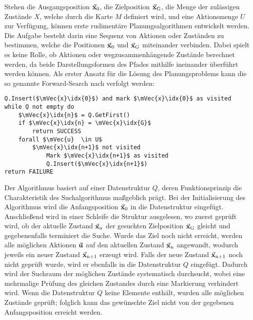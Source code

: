 Stehen die Ausgangsposition $\vec{\mathbf{x}}_{\text{0}}$, die Zielposition $\vec{\mathbf{x}}_{\text{G}}$, die Menge der zulässigen Zustände $X$, welche durch die Karte $M$ definiert wird, und eine Aktionsmenge $U$ zur Verfügung, können erste rudimentäre Planungsalgorithmen entwickelt werden. Die Aufgabe besteht darin eine Sequenz von Aktionen oder Zuständen zu bestimmen, welche die Positionen $\vec{\mathbf{x}}_{\text{0}}$ und $\vec{\mathbf{x}}_{\text{G}}$ miteinander verbinden. Dabei spielt es keine Rolle, ob Aktionen oder wegzusammenhängende Zustände berechnet werden, da beide Darstellungsformen des Pfades mithilfe ineinander überführt werden können. Als erster Ansatz für die Lösung des Planungsproblems kann die so genannte Forward-Search nach \cite[S. 28]{PlanAlgo} verfolgt werden:
\begin{lstlisting}[mathescape=true, caption={Ablauf der Forward-Search in Pseudocode}]
Q.Insert($\mVec{x}\idx{0}$) and mark $\mVec{x}\idx{0}$ as visited
while Q not empty do
	$\mVec{x}\idx{n}$ = Q.GetFirst()
	if $\mVec{x}\idx{n} = \mVec{x}\idx{G}$
		return SUCCESS
	forall $\mVec{u}  \in U$
		$\mVec{x}\idx{n+1}$ not visited
			Mark $\mVec{x}\idx{n+1}$ as visited
			Q.Insert($\mVec{x}\idx{n+1}$)
return FAILURE
\end{lstlisting}
Der Algorithmus basiert auf einer Datenstruktur $Q$, deren Funktionsprinzip die Charakteristik des Suchalgorithmus maßgeblich prägt. Bei der Initialisierung des Algorithmus wird die Anfangsposition $\vec{\mathbf{x}}_{\text{0}}$ in die Datenstruktur eingefügt. Anschließend wird in einer Schleife die Struktur ausgelesen, wo zuerst geprüft wird, ob der aktuelle Zustand $\vec{\mathbf{x}}_{\text{n}}$ der gesuchten Zielposition $\vec{\mathbf{x}}_{\text{G}}$ gleicht und gegebenenfalls terminiert die Suche. Wurde das Ziel noch nicht erreicht, werden alle möglichen Aktionen $\vec{\mathbf{u}}$ auf den aktuellen Zustand $\vec{\mathbf{x}}_{\text{n}}$ angewandt, wodurch jeweils ein neuer Zustand $\vec{\mathbf{x}}_{\text{n+1}}$ erzeugt wird. Falls der neue Zustand $\vec{\mathbf{x}}_{\text{n+1}}$ noch nicht geprüft wurde, wird er ebenfalls in die Datenstruktur $Q$ eingefügt. Dadurch wird der Suchraum der möglichen Zustände systematisch durchsucht, wobei eine mehrmalige Prüfung des gleichen Zustandes durch eine Markierung verhindert wird. Wenn die Datenstruktur $Q$ keine Elemente enthält, wurden alle möglichen Zustände geprüft; folglich kann das gewünschte Ziel nicht von der gegebenen Anfangsposition erreicht werden.

